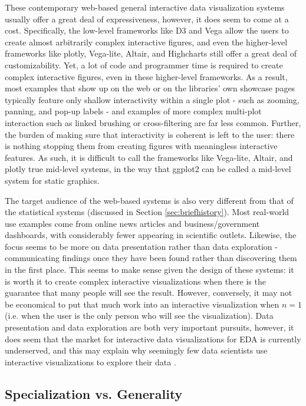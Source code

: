 \documentclass[12pt,a4paper]{article}
\begin{document}
These contemporary web-based general interactive data visualization systems usually offer a great deal of expressiveness, however, it does seem to come at a cost. Specifically, the low-level frameworks like D3 and Vega allow the users to create almost arbitrarily complex interactive figures, and even the higher-level frameworks like plotly, Vega-lite, Altair, and Highcharts still offer a great deal of customizability. Yet, a lot of code and programmer time is required to create complex interactive figures, even in these higher-level frameworks. As a result, most examples that show up on the web or on the libraries' own showcase pages typically feature only shallow interactivity within a single plot - such as zooming, panning, and pop-up labels - and examples of more complex multi-plot interaction such as linked brushing or cross-filtering are far less common. Further, the burden of making sure that interactivity is coherent is left to the user: there is nothing stopping them from creating figures with meaningless interactive features. As such, it is difficult to call the frameworks like Vega-lite, Altair, and plotly true mid-level systems, in the way that ggplot2 can be called a mid-level system for static graphics.  

The target audience of the web-based systems is also very different from that of the statistical systems (discussed in Section \ref{sec:briefhistory}). Most real-world use examples come from online news articles and business/government dashboards, with considerably fewer appearing in scientific outlets. Likewise, the focus seems to be more on data presentation rather than data exploration - communicating findings once they have been found rather than discovering them in the first place. This seems to make sense given the design of these systems: it is worth it to create complex interactive visualizations when there is the guarantee that many people will see the result. However, conversely, it may not be economical to put that much work into an interactive visualization when $n = 1$ (i.e. when the user is the only person who will see the visualization). Data presentation and data exploration are both very important pursuits, however, it does seem that the market for interactive data visualizations for EDA is currently underserved, and this may explain why seemingly few data scientists use interactive visualizations to explore their data \citep{batch2017}.  

\subsection{Specialization vs. Generality}
\end{document}
